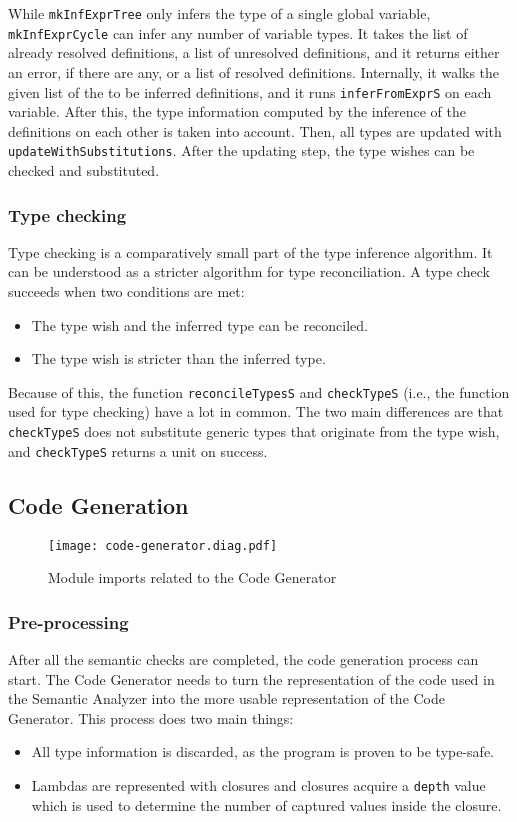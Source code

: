 \documentclass[12pt]{article}
\begin{document}
While \verb$mkInfExprTree$ only infers the type of a single global variable,
\verb$mkInfExprCycle$ can infer any number of variable types. It takes the list
of already resolved definitions, a list of unresolved definitions, and it
returns either an error, if there are any, or a list of resolved definitions.
Internally, it walks the given list of the to be inferred definitions, and it
runs \verb$inferFromExprS$ on each variable. After this, the type information
computed by the inference of the definitions on each other is taken into
account. Then, all types are updated with \verb$updateWithSubstitutions$. After
the updating step, the type wishes can be checked and substituted.

\subsubsection{Type checking}

Type checking is a comparatively small part of the type inference algorithm. It
can be understood as a stricter algorithm for type reconciliation. A type check
succeeds when two conditions are met: 
\begin{itemize}
    \item The type wish and the inferred type can be reconciled.
    \item The type wish is stricter than the inferred type.
\end{itemize}
Because of this, the function \verb$reconcileTypesS$ and \verb$checkTypeS$
(i.e., the function used for type checking) have a lot in common. The two main
differences are that \verb$checkTypeS$ does not substitute generic types that
originate from the type wish, and \verb$checkTypeS$ returns a unit on success.

\subsection{Code Generation}

\begin{figure}[ht]
\texttt{[image: code-generator.diag.pdf]}
\centering
\caption{Module imports related to the Code Generator}
\end{figure}
\subsubsection{Pre-processing}

After all the semantic checks are completed, the code generation process can
start. The Code Generator needs to turn the representation of the code used in
the Semantic Analyzer into the more usable representation of the Code Generator.
This process does two main things:
\begin{itemize}
    \item All type information is discarded, as the program is proven to be
        type-safe.
    \item Lambdas are represented with closures and closures acquire a
        \verb$depth$ value which is used to determine the number of captured
        values inside the closure.
\end{itemize}
\end{document}
